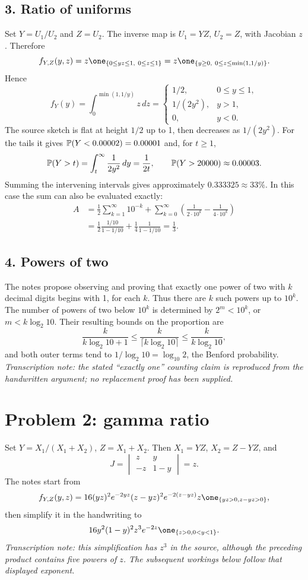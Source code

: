 \documentclass[a4paper]{article}
\begin{document}
\subsection*{3. Ratio of uniforms}
Set $Y=U_1/U_2$ and $Z=U_2$. The inverse map is $U_1=YZ$, $U_2=Z$, with Jacobian $z$. Therefore
\[f_{Y,Z}(y,z)=z\one_{\{0\le yz\le1,\ 0\le z\le1\}}
=z\one_{\{y\ge0,\ 0\le z\le\min(1,1/y)\}}.\]
Hence
\[f_Y(y)=\int_0^{\min(1,1/y)}z\,dz=
\begin{cases}1/2,&0\le y\le1,\\1/(2y^2),&y>1,\\0,&y<0.\end{cases}\]
The source sketch is flat at height $1/2$ up to 1, then decreases as $1/(2y^2)$.
For the tails it gives $\P(Y<0.00002)=0.00001$ and, for $t\ge1$,
\[\P(Y>t)=\int_t^\infty\frac1{2y^2}\,dy=\frac1{2t},\qquad\P(Y>20000)\approx0.00003.\]
Summing the intervening intervals gives approximately $0.333325\approx33\%$. In this case the sum can also be evaluated exactly:
\begin{align*}
A&=\frac12\sum_{k=1}^\infty10^{-k}
+\sum_{k=0}^\infty\left(\frac1{2\cdot10^k}-\frac1{4\cdot10^k}\right)\\
&=\frac12\frac{1/10}{1-1/10}+\frac14\frac1{1-1/10}=\frac13.
\end{align*}
\subsection*{4. Powers of two}
The notes propose observing and proving that exactly one power of two with $k$ decimal digits begins with 1, for each $k$. Thus there are $k$ such powers up to $10^k$. The number of powers of two below $10^k$ is determined by $2^m<10^k$, or $m<k\log_2 10$. Their resulting bounds on the proportion are
\[\frac{k}{k\log_2 10+1}\le\frac{k}{\lceil k\log_2 10\rceil}\le\frac{k}{k\log_2 10},\]
and both outer terms tend to $1/\log_2 10=\log_{10}2$, the Benford probability.
\noindent\textit{Transcription note: the stated ``exactly one'' counting claim is reproduced from the handwritten argument; no replacement proof has been supplied.}
\section*{Problem 2: gamma ratio}
Set $Y=X_1/(X_1+X_2)$, $Z=X_1+X_2$. Then $X_1=YZ$, $X_2=Z-YZ$, and
\[J=\begin{vmatrix}z&y\\-z&1-y\end{vmatrix}=z.\]
The notes start from
\[f_{Y,Z}(y,z)=16(yz)^2e^{-2yz}(z-yz)^2e^{-2(z-yz)}z\one_{\{yz>0,z-yz>0\}},\]
then simplify it in the handwriting to
\[16y^2(1-y)^2z^3e^{-2z}\one_{\{z>0,0<y<1\}}.\]
\noindent\textit{Transcription note: this simplification has $z^3$ in the source, although the preceding product contains five powers of $z$. The subsequent workings below follow that displayed exponent.}
\end{document}
